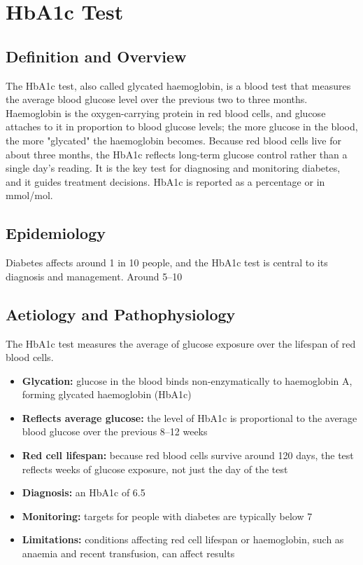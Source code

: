 \chapter{HbA1c Test}

\section*{Definition and Overview}
The HbA1c test, also called glycated haemoglobin, is a blood test that measures the average blood glucose level over the previous two to three months. Haemoglobin is the oxygen-carrying protein in red blood cells, and glucose attaches to it in proportion to blood glucose levels; the more glucose in the blood, the more "glycated" the haemoglobin becomes. Because red blood cells live for about three months, the HbA1c reflects long-term glucose control rather than a single day's reading. It is the key test for diagnosing and monitoring diabetes, and it guides treatment decisions. HbA1c is reported as a percentage or in mmol/mol.

\section*{Epidemiology}
Diabetes affects around 1 in 10 people, and the HbA1c test is central to its diagnosis and management. Around 5--10%

\section*{Aetiology and Pathophysiology}
The HbA1c test measures the average of glucose exposure over the lifespan of red blood cells.

\begin{itemize}
    \item \textbf{Glycation:} glucose in the blood binds non-enzymatically to haemoglobin A, forming glycated haemoglobin (HbA1c)
    \item \textbf{Reflects average glucose:} the level of HbA1c is proportional to the average blood glucose over the previous 8--12 weeks
    \item \textbf{Red cell lifespan:} because red blood cells survive around 120 days, the test reflects weeks of glucose exposure, not just the day of the test
    \item \textbf{Diagnosis:} an HbA1c of 6.5%
    \item \textbf{Monitoring:} targets for people with diabetes are typically below 7%
    \item \textbf{Limitations:} conditions affecting red cell lifespan or haemoglobin, such as anaemia and recent transfusion, can affect results
\end{itemize}

